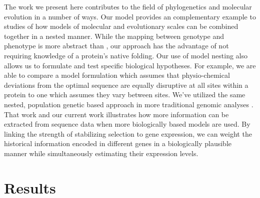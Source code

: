 \documentclass{article}
\begin{document}
The work we present here contributes to the field of phylogenetics and molecular evolution in a number of ways.
Our model provides an complementary example to \citet{ThorneEtAl2012} studies of how models of molecular and evolutionary scales can be combined together in a nested manner.
While the mapping between genotype and phenotype is more abstract than \citet{ThorneEtAl2012}, our approach has the advantage of not requiring knowledge of a protein's native folding.
Our use of model nesting also allows us to formulate and test specific biological hypotheses.
For example, we are able to compare a model formulation which assumes that physio-chemical deviations from the optimal sequence are equally disruptive at all sites within a protein to one which assumes they vary between sites.
We've utilized the same nested, population genetic based approach in more traditional genomic analyses \citep[e.g.][]{Gilchrist2007,ShahAndGilchrist2011,GilchristEtAl2015}.
That work and our current work illustrates how more information can be extracted from sequence data when more biologically based models are used.
By linking the strength of stabilizing selection to gene expression,  we can weight the historical information encoded in different genes in a biologically plausible manner while simultaneously estimating their expression levels.




\section*{Results}
\end{document}
